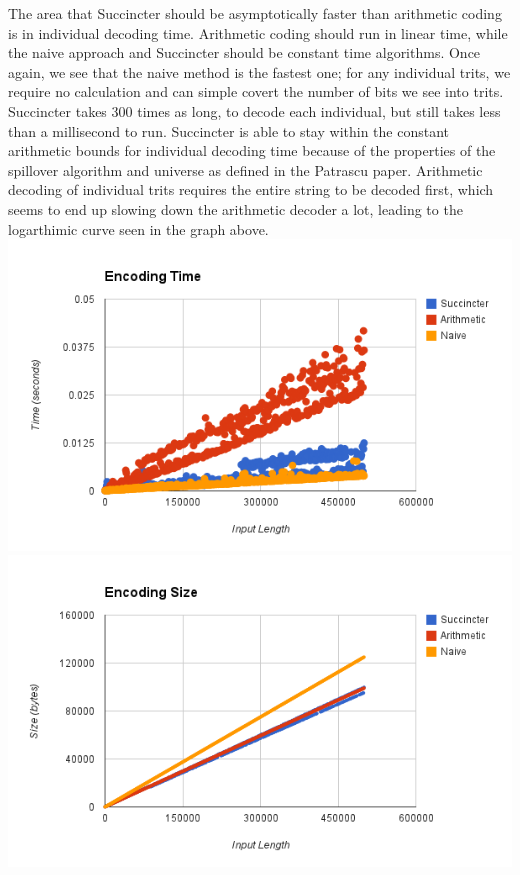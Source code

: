 \documentclass{article}
\begin{document}
\indent The area that Succincter should be asymptotically faster than arithmetic coding is in individual decoding time. Arithmetic coding should run in linear time, while the naive approach and Succincter should be constant time algorithms. Once again, we see that the naive method is the fastest one; for any individual trits, we require no calculation and can simple covert the number of bits we see into trits. Succincter takes 300 times as long, to decode each individual, but still takes less than a millisecond to run. Succincter is able to stay within the constant arithmetic bounds for individual decoding time because of the properties of the spillover algorithm and universe as defined in the Patrascu paper. Arithmetic decoding of individual trits requires the entire string to be decoded first, which seems to end up slowing down the arithmetic decoder a lot, leading to the logarthimic curve seen in the graph above.\\


\includegraphics[scale=0.4]{images/encoding_time}
\includegraphics[scale=0.4]{images/encoding_size}
\afterpage{\vfill}
\end{document}
